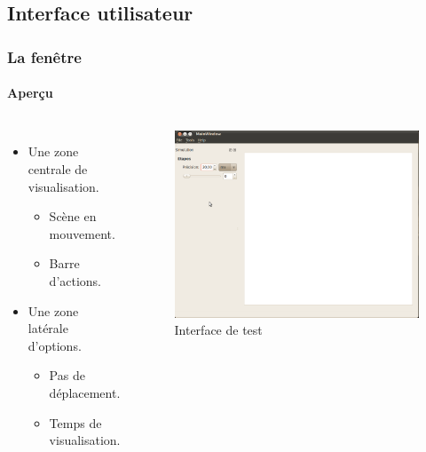 \documentclass{beamer}
\begin{document}
\subsection{Interface utilisateur}
\begin{frame}
    \frametitle{La fenêtre}
    \framesubtitle{Aperçu}
    \begin{columns}
        \begin{itemize}
            \item Une zone centrale de visualisation.
                \begin{itemize}
                    \item Scène en mouvement.
                    \item Barre d'actions.
                \end{itemize}
            \item Une zone latérale d'options.
                \begin{itemize}
                    \item Pas de déplacement.
                    \item Temps de visualisation.
                \end{itemize}
        \end{itemize}
        \begin{figure}
            \includegraphics[width=\textwidth]{img/interface.png}
            \caption{Interface de test}
            \label{Interface}
        \end{figure}
    \end{columns}
\end{frame}
\end{document}
